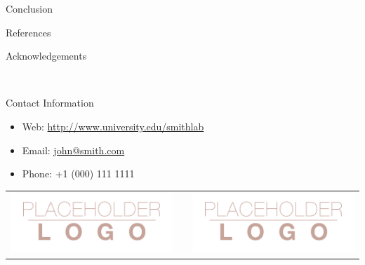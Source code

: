 \documentclass[final]{beamer}
\newlength{\onecolwid}
\begin{document}
\begin{frame}[t]
\begin{columns}[t]
\begin{column}{\onecolwid}
\begin{block}{Conclusion}
\begin{block}{References}
\end{block}



\begin{block}{Acknowledgements}

\small{} \\

\end{block}



\begin{alertblock}{Contact Information}

\begin{itemize}
\item Web: \href{http://www.university.edu/smithlab}{http://www.university.edu/smithlab}
\item Email: \href{mailto:john@smith.com}{john@smith.com}
\item Phone: +1 (000) 111 1111
\end{itemize}

\end{alertblock}

\begin{center}
\begin{tabular}{ccc}
\includegraphics[width=0.4\linewidth]{logo.png} & \hfill & \includegraphics[width=0.4\linewidth]{logo.png}
\end{tabular}
\end{center}


\end{block}
\end{column}
\end{columns}
\end{frame}
\end{document}
